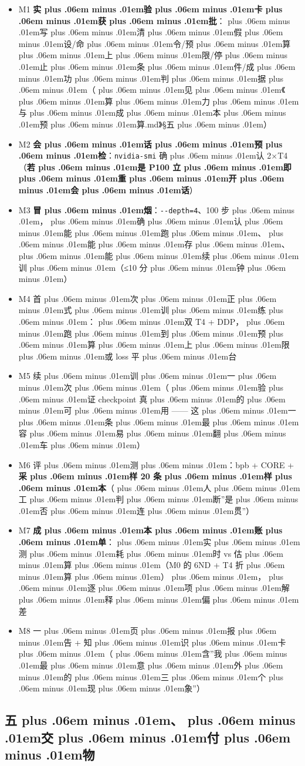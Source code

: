 \documentclass[
]{article}
\newcommand{\passthrough}[1]{#1}
\providecommand{\tightlist}{%
  \setlength{\itemsep}{0pt}\setlength{\parskip}{0pt}}
\def\zh#1{{\zhfont #1}}
\def\sym#1{{\symfont #1}}
\def\zhglue{\hskip0pt plus .06em minus .01em}
\begin{document}
\begin{itemize}
\tightlist
\item[$\square$]
  M1 \textbf{\zh{实\zhglue 验\zhglue 卡\zhglue 获\zhglue 批}}\zh{：\zhglue 写\zhglue 清\zhglue 假\zhglue 设}/\zh{命\zhglue 令}/\zh{预\zhglue 算\zhglue 上\zhglue 限}/\zh{停\zhglue 止\zhglue 条\zhglue 件}/\zh{成\zhglue 功\zhglue 判\zhglue 据\zhglue （\zhglue 见\zhglue 《\zhglue 算\zhglue 力\zhglue 与\zhglue 成\zhglue 本\zhglue 预\zhglue 算}.md\zh{》}\sym{§}\zh{五\zhglue ）}
\item[$\square$]
  M2 \textbf{\zh{会\zhglue 话\zhglue 预\zhglue 检}}\zh{：}\passthrough{\lstinline!nvidia-smi!} \zh{确\zhglue 认} 2\sym{×}T4\zh{（}\textbf{\zh{若\zhglue 是} P100 \zh{立\zhglue 即\zhglue 重\zhglue 开\zhglue 会\zhglue 话}}\zh{）}
\item[$\square$]
  M3 \textbf{\zh{冒\zhglue 烟}}\zh{：}\passthrough{\lstinline!--depth=4!}\zh{、}100 \zh{步\zhglue ，\zhglue 确\zhglue 认\zhglue 能\zhglue 跑\zhglue 、\zhglue 能\zhglue 存\zhglue 、\zhglue 能\zhglue 续\zhglue 训\zhglue （}\sym{≤}10 \zh{分\zhglue 钟\zhglue ）}
\item[$\square$]
  M4 \zh{首\zhglue 次\zhglue 正\zhglue 式\zhglue 训\zhglue 练\zhglue ：\zhglue 双} T4 + DDP\zh{，\zhglue 跑\zhglue 到\zhglue 预\zhglue 算\zhglue 上\zhglue 限\zhglue 或} loss \zh{平\zhglue 台}
\item[$\square$]
  M5 \zh{续\zhglue 训\zhglue 一\zhglue 次\zhglue （\zhglue 验\zhglue 证} checkpoint \zh{真\zhglue 的\zhglue 可\zhglue 用} ------ \zh{这\zhglue 一\zhglue 条\zhglue 最\zhglue 容\zhglue 易\zhglue 翻\zhglue 车\zhglue ）}
\item[$\square$]
  M6 \zh{评\zhglue 测\zhglue ：}bpb + CORE + \textbf{\zh{采\zhglue 样} 20 \zh{条\zhglue 样\zhglue 本}}\zh{（\zhglue 人\zhglue 工\zhglue 判\zhglue 断}''\zh{是\zhglue 否\zhglue 连\zhglue 贯}''\zh{）}
\item[$\square$]
  M7 \textbf{\zh{成\zhglue 本\zhglue 账\zhglue 单}}\zh{：\zhglue 实\zhglue 测\zhglue 耗\zhglue 时} vs \zh{估\zhglue 算\zhglue （}M0 \zh{的} 6ND + T4 \zh{折\zhglue 算\zhglue ）\zhglue ，\zhglue 逐\zhglue 项\zhglue 解\zhglue 释\zhglue 偏\zhglue 差}
\item[$\square$]
  M8 \zh{一\zhglue 页\zhglue 报\zhglue 告} + \zh{知\zhglue 识\zhglue 卡\zhglue （\zhglue 含}''\zh{我\zhglue 最\zhglue 意\zhglue 外\zhglue 的\zhglue 三\zhglue 个\zhglue 现\zhglue 象}''\zh{）}
\end{itemize}

\subsection{\zh{五\zhglue 、\zhglue 交\zhglue 付\zhglue 物}}\label{ux4e94ux4ea4ux4ed8ux7269}
\end{document}
